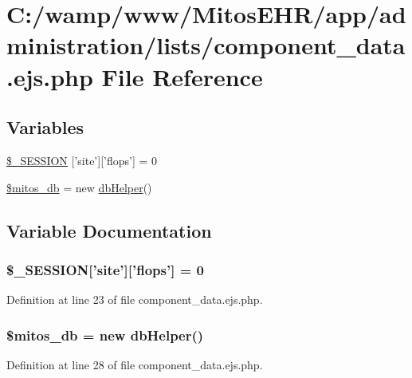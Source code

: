 \hypertarget{administration_2lists_2component__data_8ejs_8php}{\section{\-C\-:/wamp/www/\-Mitos\-E\-H\-R/app/administration/lists/component\-\_\-data.ejs.\-php \-File \-Reference}
\label{administration_2lists_2component__data_8ejs_8php}
}
\subsection*{\-Variables}
\begin{DoxyCompactItemize}
\item 
\hyperlink{administration_2lists_2component__data_8ejs_8php_a99fda8552a3e58235643b79f5af3ded8}{\$\-\_\-\-S\-E\-S\-S\-I\-O\-N} \mbox{[}'site'\mbox{]}\mbox{[}'flops'\mbox{]} = 0
\item 
\hyperlink{administration_2lists_2component__data_8ejs_8php_ab5d961f93efe4e2e8d8374f01dd6c65a}{\$mitos\-\_\-db} = new \hyperlink{classdb_helper}{db\-Helper}()
\end{DoxyCompactItemize}


\subsection{\-Variable \-Documentation}
\hypertarget{administration_2lists_2component__data_8ejs_8php_a99fda8552a3e58235643b79f5af3ded8}{
\subsubsection[{\$\-\_\-\-S\-E\-S\-S\-I\-O\-N}]{\setlength{\rightskip}{0pt plus 5cm}\$\-\_\-\-S\-E\-S\-S\-I\-O\-N\mbox{[}'site'\mbox{]}\mbox{[}'flops'\mbox{]} = 0}}\label{administration_2lists_2component__data_8ejs_8php_a99fda8552a3e58235643b79f5af3ded8}


\-Definition at line 23 of file component\-\_\-data.\-ejs.\-php.

\hypertarget{administration_2lists_2component__data_8ejs_8php_ab5d961f93efe4e2e8d8374f01dd6c65a}{
\subsubsection[{\$mitos\-\_\-db}]{\setlength{\rightskip}{0pt plus 5cm}\$mitos\-\_\-db = new {\bf db\-Helper}()}}\label{administration_2lists_2component__data_8ejs_8php_ab5d961f93efe4e2e8d8374f01dd6c65a}


\-Definition at line 28 of file component\-\_\-data.\-ejs.\-php.

